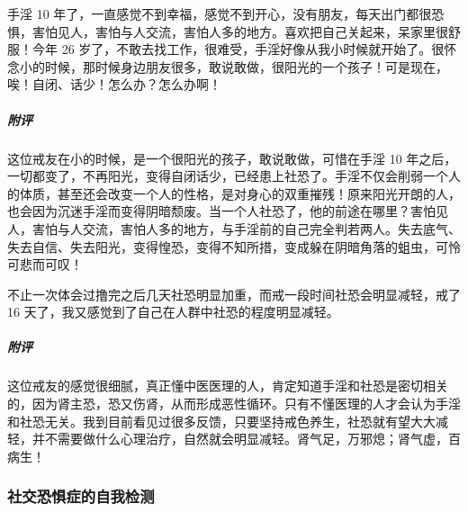 \begin{case}[社恐]
    手淫 10 年了，一直感觉不到幸福，感觉不到开心，没有朋友，每天出门都很恐惧，害怕见人，害怕与人交流，害怕人多的地方。喜欢把自己关起来，呆家里很舒服！今年 26 岁了，不敢去找工作，很难受，手淫好像从我小时候就开始了。很怀念小的时候，那时候身边朋友很多，敢说敢做，很阳光的一个孩子！可是现在，唉！自闭、话少！怎么办？怎么办啊！
    \subparagraph{附评} 这位戒友在小的时候，是一个很阳光的孩子，敢说敢做，可惜在手淫 10 年之后，一切都变了，不再阳光，变得自闭话少，已经患上社恐了。手淫不仅会削弱一个人的体质，甚至还会改变一个人的性格，是对身心的双重摧残！原来阳光开朗的人，也会因为沉迷手淫而变得阴暗颓废。当一个人社恐了，他的前途在哪里？害怕见人，害怕与人交流，害怕人多的地方，与手淫前的自己完全判若两人。失去底气、失去自信、失去阳光，变得惶恐，变得不知所措，变成躲在阴暗角落的蛆虫，可怜可悲而可叹！
\end{case}

\begin{case}[社恐]
    不止一次体会过撸完之后几天社恐明显加重，而戒一段时间社恐会明显减轻，戒了 16 天了，我又感觉到了自己在人群中社恐的程度明显减轻。
    \subparagraph{附评} 这位戒友的感觉很细腻，真正懂中医医理的人，肯定知道手淫和社恐是密切相关的，因为肾主恐，恐又伤肾，从而形成恶性循环。只有不懂医理的人才会认为手淫和社恐无关。我到目前看见过很多反馈，只要坚持戒色养生，社恐就有望大大减轻，并不需要做什么心理治疗，自然就会明显减轻。肾气足，万邪熄；肾气虚，百病生！
\end{case}

\subsubsection{社交恐惧症的自我检测}

